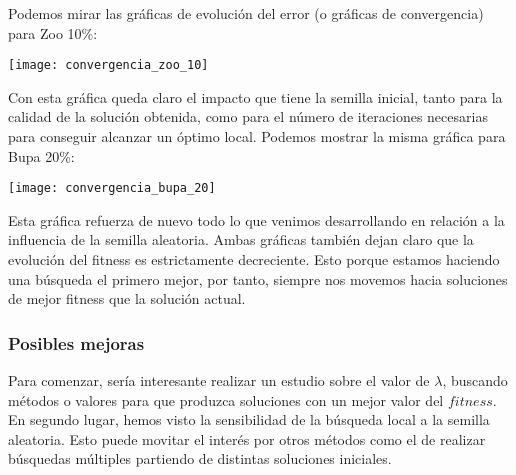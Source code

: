 \documentclass[11pt]{article}
\begin{document}
Podemos mirar las gráficas de evolución del error (o gráficas de convergencia) para Zoo 10\%:

\texttt{[image: convergencia\_zoo\_10]}

Con esta gráfica queda claro el impacto que tiene la semilla inicial, tanto para la calidad de la solución obtenida, como para el número de iteraciones necesarias para conseguir alcanzar un óptimo local. Podemos mostrar la misma gráfica para Bupa 20\%:

\texttt{[image: convergencia\_bupa\_20]}

Esta gráfica refuerza de nuevo todo lo que venimos desarrollando en relación a la influencia de la semilla aleatoria. Ambas gráficas también dejan claro que la evolución del fitness es estrictamente decreciente. Esto porque estamos haciendo una búsqueda el primero mejor, por tanto, siempre nos movemos hacia soluciones de mejor fitness que la solución actual.

\subsubsection{Posibles mejoras}

Para comenzar, sería interesante realizar un estudio sobre el valor de $\lambda$, buscando métodos o valores para que produzca soluciones con un mejor valor del $fitness$. En segundo lugar, hemos visto la sensibilidad de la búsqueda local a la semilla aleatoria. Esto puede movitar el interés por otros métodos como el de realizar búsquedas múltiples partiendo de distintas soluciones iniciales.
\end{document}
